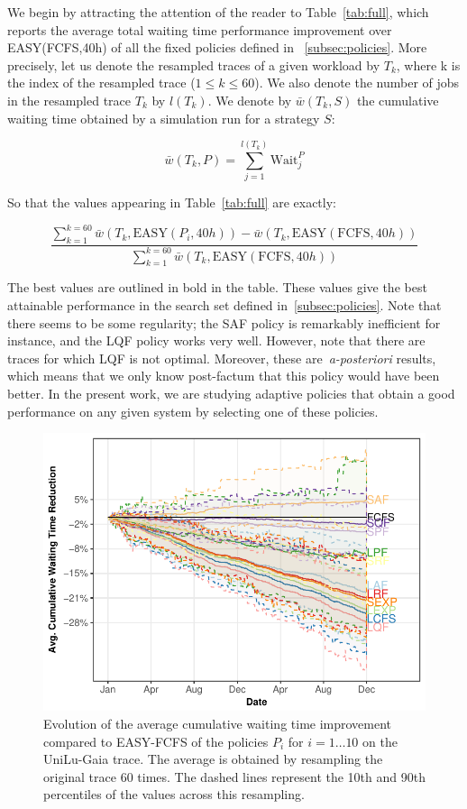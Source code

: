 \documentclass[sigconf,anonymous]{acmart}
\begin{document}
We begin by attracting the attention of the reader to Table~\ref{tab:full},
which reports the average total waiting time performance improvement over
EASY(FCFS,40h) of all the fixed policies defined in ~\ref{subsec:policies}. More
precisely, let us denote the resampled traces of a given workload by $T_k$,
where k is the index of the resampled trace ($1 \le k \le 60$). We also denote
the number of jobs in the resampled trace $T_k$ by $l(T_k)$. We denote by
$\bar{w}(T_k,S)$ the cumulative waiting time obtained by a simulation run for a
strategy $S$:

\begin{equation}
  \bar{w}(T_k,P) = \sum_{j=1}^{l(T_k)} \text{Wait}_j^{P}
\end{equation}

So that the values appearing in Table~\ref{tab:full} are exactly:

\begin{equation}
  \frac{\sum_{k=1}^{k=60}\bar{w}(T_k,\text{EASY}(P_i,40h))-
  \bar{w}(T_k,\text{EASY}(\text{FCFS},40h))}{\sum_{k=1}^{k=60}\bar{w}(T_k,\text{EASY}(\text{FCFS},40h))}
\end{equation}

The best values are outlined in bold in the table. These values give the best
attainable performance in the search set defined in~\ref{subsec:policies}.
Note that there seems to be some regularity; the SAF policy is remarkably
inefficient for instance, and the LQF policy works very well. However, note
that there are traces for which LQF is not optimal. Moreover, these
are~\textit{a-posteriori} results, which means that we only know post-factum
that this policy would have been better. In the present work, we are
studying adaptive policies that obtain a good performance on any given system
by selecting one of these policies.

\begin{figure}[]
  \centering
  \includegraphics[scale=0.6]{figures/full-ANL-Intr.pdf}
  \caption{Evolution of the average cumulative waiting time improvement
    compared to EASY-FCFS of the policies $P_i$ for $i = 1 \ldots 10$ on the
    UniLu-Gaia trace. The average is obtained by resampling the original trace
    60 times. The dashed lines represent the 10th and 90th percentiles of the
  values across this resampling.}
  \label{fig:all}
\end{figure}
\end{document}
